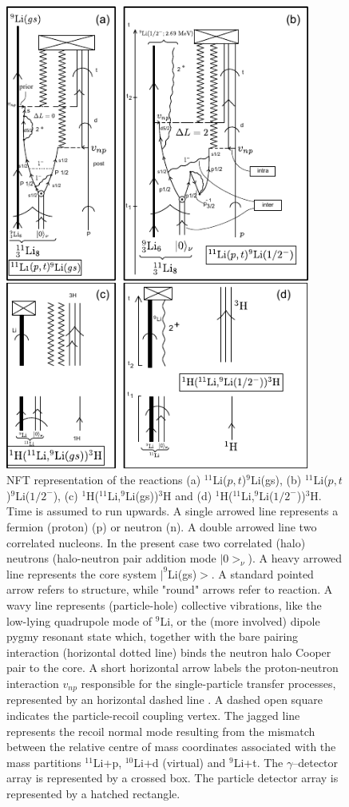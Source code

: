   
    \begin{figure}
    \centerline{\includegraphics*[width=10cm,angle=0]{C8/figsC8/fig2_newnew}}
    	\caption{NFT representation  of the reactions (a) $^{11}$Li($p,t$)$^9$Li(gs), (b) $^{11}$Li($p,t$)$^9$Li($1/2^-$), (c)  $^{1}$H($^{11}$Li,$^9$Li(gs))$^3$H and (d) $^{1}$H($^{11}$Li,$^9$Li($1/2^-$))$^3$H. Time is assumed to run upwards.
    	A single arrowed line represents a fermion (proton) (p) or neutron (n). A double arrowed line  two correlated nucleons. In the present case two correlated (halo) neutrons (halo-neutron pair addition mode $|0>_{\nu}$). A heavy arrowed line represents  the core system $|^9$Li(gs)$>$. A standard 
    	pointed arrow refers to structure, while "round" arrows refer to reaction. A wavy line represents (particle-hole) collective vibrations,
    	 like the low-lying quadrupole mode of $^9$Li, or the (more involved) dipole pygmy resonant state  which, together  with the bare pairing interaction (horizontal dotted line) binds the neutron  halo Cooper pair to the core.  A short horizontal arrow labels the proton-neutron interaction $v_{np}$ responsible for  the single-particle transfer  processes, represented by an horizontal dashed line .
    	 A dashed open square  indicates the particle-recoil coupling vertex.
    	   The jagged line  represents the recoil normal mode resulting from the mismatch between the relative centre of mass coordinates  associated with  the mass partitions $^{11}$Li+p, $^{10}$Li+d (virtual) and  $^9$Li+t. 
    	 The $\gamma$--detector array is represented by a crossed box. The particle detector array is represented by a hatched rectangle.
    	}\label{fig6.6.3}
    \end{figure}
